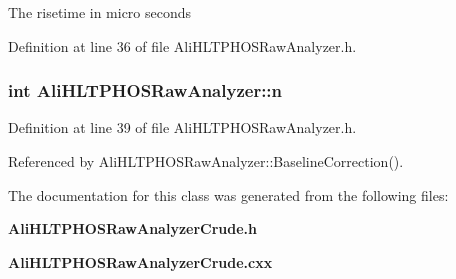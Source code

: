 The risetime in micro seconds 

Definition at line 36 of file Ali\-HLTPHOSRaw\-Analyzer.h.
\subsubsection{\setlength{\rightskip}{0pt plus 5cm}int {\bf Ali\-HLTPHOSRaw\-Analyzer::n}\hspace{0.3cm}{\tt  [protected, inherited]}}\label{classAliHLTPHOSRawAnalyzer_AliHLTPHOSRawAnalyzerPeakFinderp7}




Definition at line 39 of file Ali\-HLTPHOSRaw\-Analyzer.h.

Referenced by Ali\-HLTPHOSRaw\-Analyzer::Baseline\-Correction().

The documentation for this class was generated from the following files:\begin{CompactItemize}
\item 
{\bf Ali\-HLTPHOSRaw\-Analyzer\-Crude.h}\item 
{\bf Ali\-HLTPHOSRaw\-Analyzer\-Crude.cxx}\end{CompactItemize}

